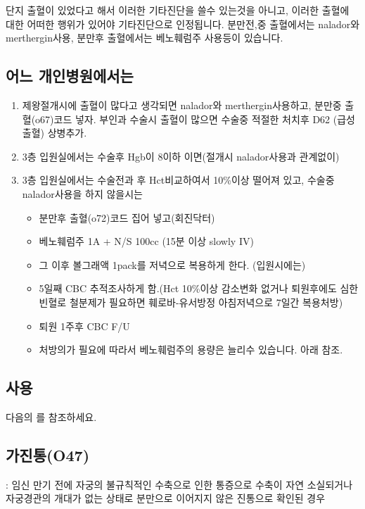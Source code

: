 \begin{shaded}
단지 출혈이 있었다고 해서 이러한 기타진단을 쓸수 있는것을 아니고, 이러한 출혈에 대한 어떠한 행위가 있어야 기타진단으로 인정됩니다. 분만전,중 출혈에서는 nalador와 merthergin사용, 분만후 출혈에서는 베노훼럼주 사용등이 있습니다. 
\end{shaded}
\subsection*{어느 개인병원에서는}
\begin{enumerate}[가.]\tightlist
\item 제왕절개시에 출혈이 많다고 생각되면 nalador와 merthergin사용하고, 분만중 출혈(o67)코드 넣자. 부인과 수술시 출혈이 많으면 수술중 적절한 처치후 D62 (급성출혈) 상병추가.
\item 3층 입원실에서는 수술후 Hgb이 8이하 이면(절개시 nalador사용과 관계없이) 
\item 3층 입원실에서는 수술전과 후 Hct비교하여서 10\%이상 떨어져 있고, 수술중 nalador사용을 하지 않을시는 
	\begin{itemize}\tightlist
	\item 분만후 출혈(o72)코드 집어 넣고(회진닥터)
	\item 베노훼럼주 1A + N/S 100cc (15분 이상 slowly IV)
	\item 그 이후 볼그래액 1pack를 저녁으로 복용하게 한다. (입원시에는)
	\item 5일째 CBC 추적조사하게 함.(Hct 10\%이상 감소변화 없거나 퇴원후에도 심한 빈혈로 철분제가 필요하면 훼로바-유서방정 아침저녁으로 7일간 복용처방) 
	\item 퇴원 1주후 CBC F/U
	\item 처방의가 필요에 따라서 베노훼럼주의 용량은 늘리수 있습니다. 아래 참조.
	\end{itemize}
\end{enumerate}
\subsection*{ 사용} 
다음의 \pageref{VenoferrumInj}를 참조하세요.


\subsection*{가진통(O47)}
 : 임신 만기 전에 자궁의 불규칙적인 수축으로 인한 통증으로 수축이 자연 소실되거나 자궁경관의 개대가 없는 상태로 분만으로 이어지지 않은 진통으로 확인된 경우
